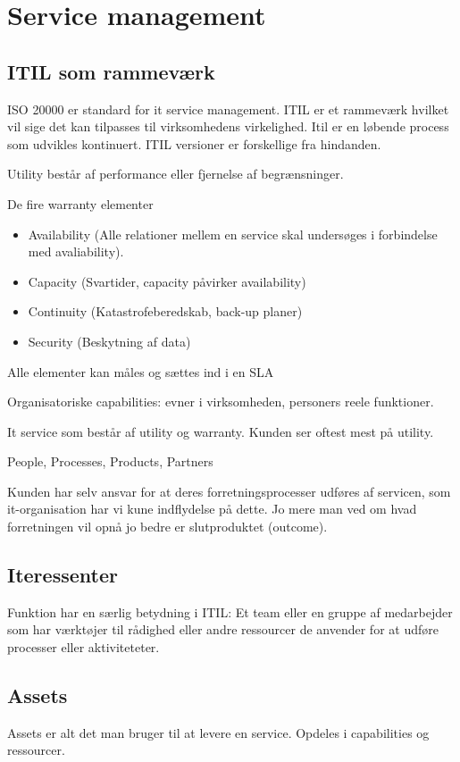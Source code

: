 \section{Service management}
\subsection{ITIL som rammeværk}
ISO 20000 er standard for it service management. ITIL er et rammeværk hvilket vil sige det kan tilpasses til virksomhedens virkelighed.
Itil er en løbende process som udvikles kontinuert. ITIL versioner er forskellige fra hindanden.

Utility består af performance eller fjernelse af begrænsninger.

De fire warranty elementer
\begin{itemize}
\item Availability (Alle relationer mellem en service skal undersøges i forbindelse med avaliability).
\item Capacity (Svartider, capacity påvirker availability)
\item Continuity (Katastrofeberedskab, back-up planer)
\item Security (Beskytning af data)
\end{itemize}

Alle elementer kan måles og sættes ind i en SLA

Organisatoriske capabilities: evner i virksomheden, personers reele funktioner.

It service som består af utility og warranty. Kunden ser oftest mest på utility.

People, Processes, Products, Partners

Kunden har selv ansvar for at deres forretningsprocesser udføres af servicen, som it-organisation har vi kune indflydelse på dette. Jo mere man ved om hvad forretningen vil opnå jo bedre er slutproduktet (outcome).

\subsection{Iteressenter}
Funktion har en særlig betydning i ITIL: Et team eller en gruppe af medarbejder som har værktøjer til rådighed eller andre ressourcer de anvender for at udføre processer eller aktiviteteter.

\subsection{Assets}
Assets er alt det man bruger til at levere en service. Opdeles i capabilities og ressourcer. 


